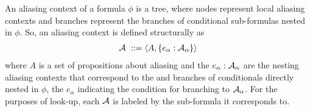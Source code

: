 \newcommand{\context}[2]{\langle #1, #2 \rangle}

An aliasing context of a formula $\phi$ is a tree, where nodes represent local aliasing contexts and branches represent the branches of conditional sub-formulas nested in $\phi$. So, an aliasing context is defined structurally as
\begin{align*}
  \A \ ::= \context{A}{\set{e_\alpha : \A_\alpha}}
\end{align*}
where $A$ is a set of propositions about aliasing and the $e_\alpha : \mathcal{A}_\alpha$ are the nesting aliasing contexts that correspond to the  and  branches of conditionals directly nested in $\phi$, the $e_\alpha$ indicating the condition for branching to $\mathcal{A}_\alpha$. For the purposes of look-up, each $\mathcal{A}$ is labeled by the sub-formula it corresponds to.

